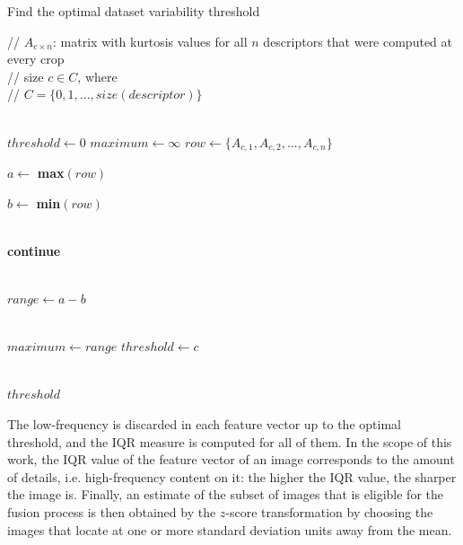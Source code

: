 \begin{algorithm}[ht]
	\caption{Find the optimal dataset variability threshold}
	\label{alg:cut_threshold}
	\begin{algorithmic}[1]
 		\State // $A_{c \times n}$: matrix with kurtosis values for all $n$ descriptors that were computed at every crop \\ // size $c \in C$, where \\ // $C = \{0,1,...,size(descriptor)\}$ 
		
		\\
		
		\State $threshold \gets 0$
		\State $maximum \gets \infty$
		\State $row \gets \{A_{c,1},A_{c,2},...,A_{c,n}\}$ 
		
		\State $a \gets$ \textbf{max}$(row)$
		
		\State $b \gets$ \textbf{min}$(row)$
		
		\\
		
		    \State \textbf{continue}
		\EndIf
		
		\\
		
		\State $range \gets a - b$
		
		\\
		
		    \State $maximum \gets range$
		    \State $threshold \gets c$
		\EndIf
		
		\EndFor
		\\
		\Return $threshold$
	\end{algorithmic}
\end{algorithm}

The low-frequency is discarded in each feature vector up to the optimal threshold, and the IQR measure is computed for all of them. In the scope of this work, the IQR value of the feature vector of an image corresponds to the amount of details, i.e. high-frequency content on it: the higher the IQR value, the sharper the image is. Finally, an estimate of the subset of images that is eligible for the fusion process is then obtained by the $z$-score transformation by choosing the images that locate at one or more standard deviation units away from the mean.